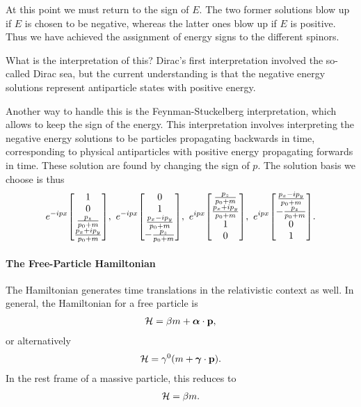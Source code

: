 At this point we must return to the sign of $E$. The two former solutions blow up if $E$ is chosen to be negative, whereas the latter ones blow up if $E$ is positive. Thus we have achieved the assignment of energy signs to the different spinors.

What is the interpretation of this? Dirac's first interpretation involved the so-called Dirac sea, but the current understanding is that the negative energy solutions represent antiparticle states with positive energy.

Another way to handle this is the Feynman-Stuckelberg interpretation, which allows to keep the sign of the energy. This interpretation involves interpreting the negative energy solutions to be particles propagating backwards in time, corresponding to physical antiparticles with positive energy propagating forwards in time. These solution are found by changing the sign of $p$. The solution basis we choose is thus
\begin{align*}
	e^{-ipx}\mqty[
		1 \\
		0 \\
		\frac{p_{z}}{p_{0} + m} \\
		\frac{p_{x} + ip_{y}}{p_{0} + m}
	],\ e^{-ipx}\mqty[
		0 \\
		1 \\
		\frac{p_{x} - ip_{y}}{p_{0} + m} \\
		-\frac{p_{z}}{p_{0} + m}
	],\ e^{ipx}\mqty[
		\frac{p_{z}}{p_{0} + m} \\
		\frac{p_{x} + ip_{y}}{p_{0} + m} \\
		1 \\
		0
	],\ e^{ipx}\mqty[
		\frac{p_{x} - ip_{y}}{p_{0} + m} \\
		-\frac{p_{z}}{p_{0} + m} \\
		0 \\
		1
	].
\end{align*}

\paragraph{The Free-Particle Hamiltonian}
The Hamiltonian generates time translations in the relativistic context as well. In general, the Hamiltonian for a free particle is
\begin{align*}
	\mathcal{H} = \beta m + \vb*{\alpha}\cdot\vb{p},
\end{align*}
or alternatively
\begin{align*}
	\mathcal{H} = \gamma^{0}(m + \vb*{\gamma}\cdot\vb{p}).
\end{align*}
In the rest frame of a massive particle, this reduces to
\begin{align*}
	\mathcal{H} = \beta m.
\end{align*}

